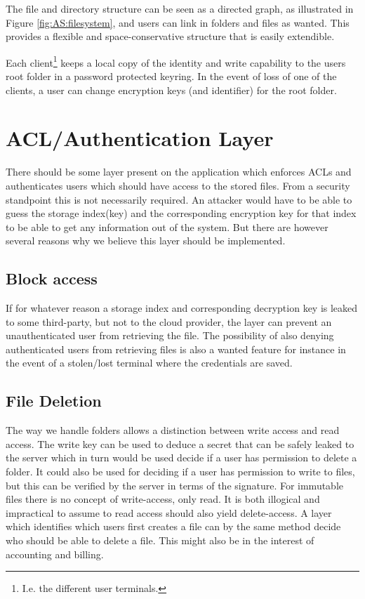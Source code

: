 \documentclass[pdftex,english,10pt,b5paper,twoside]{book}
\begin{document}
The file and directory structure can be seen as a directed graph, as illustrated
in Figure \ref{fig:AS:filesystem}, and users can link in folders and files as
wanted. This provides a flexible and space-conservative structure that is easily
extendible.

Each client\footnote{I.e. the different user terminals.} keeps a local copy of
the identity and write capability to the users root folder in a password
protected keyring. In the event of loss of one of the clients, a user can change
encryption keys (and identifier) for the root folder.

\section{ACL/Authentication Layer}
There should be some layer present on the application which enforces \ac{ACL}s and
authenticates users which should have access to the stored files. From a security 
standpoint this is not necessarily required. An attacker would have to be able
to guess the storage index(key) and the corresponding encryption key for that
index to be able to get any information out of the system. But there are however
several reasons why we believe this layer should be implemented.

\subsection{Block access}
If for whatever reason a storage index and corresponding decryption key is
leaked to some third-party, but not to the cloud provider, the layer can
prevent an unauthenticated user from retrieving the file. The possibility of
also denying authenticated users from retrieving files is also a wanted feature
for instance in the event of a stolen/lost terminal where the credentials are
saved.

\subsection{File Deletion}
The way we handle folders allows a distinction between write access and read
access. The write key can be used to deduce a secret that can be safely leaked
to the server which in turn would be used decide if a user has permission to
delete a folder. It could also be used for deciding if a user has permission to
write to files, but this can be verified by the server in terms of the
signature.
For immutable files there is no concept of write-access, only read. It is
both illogical and impractical to assume to read access should also yield
delete-access. A layer which identifies which users first creates a file can
by the same method decide who should be able to delete a file. This might also
be in the interest of accounting and billing.
\end{document}
